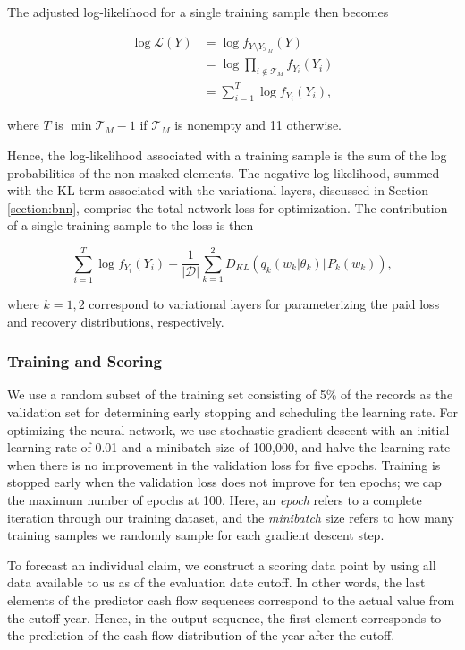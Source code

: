 \documentclass{article}
\begin{document}
The adjusted log-likelihood for a single training sample then becomes

\begin{align}
    \log\mathcal{L}(Y) &= \log  f_{Y\setminus Y_{\mathcal{T}_M}}(Y)\\
                       &= \log \prod_{i \notin \mathcal{T}_M} f_{Y_i}(Y_i)\\
                       &= \sum_{i = 1}^{T}\log f_{Y_i}(Y_i),
\end{align}

where $T$ is $\min \mathcal{T}_M - 1$ if $\mathcal{T}_M$ is nonempty and 11 otherwise.

Hence, the log-likelihood associated with a training sample is the sum of the log probabilities of the non-masked elements. The negative log-likelihood, summed with the KL term associated with the variational layers, discussed in Section  \ref{section:bnn}, comprise the total network loss for optimization. The contribution of a single training sample to the loss is then

\begin{equation}
    \sum_{i = 1}^{T}\log f_{Y_i}(Y_i) + \frac{1}{|\mathcal{D}|}\sum_{k=1}^2D_{KL}(q_k(w_k|\theta_k) \Vert P_k(w_k)),
\end{equation}

where $k=1, 2$ correspond to variational layers for parameterizing the paid loss and recovery distributions, respectively.

\subsubsection{Training and Scoring}

We use a random subset of the training set consisting of 5\% of the records as the validation set for determining early stopping and scheduling the learning rate. For optimizing the neural network, we use stochastic gradient descent with an initial learning rate of 0.01 and a minibatch size of 100,000, and halve the learning rate when there is no improvement in the validation loss for five epochs. Training is stopped early when the validation loss does not improve for ten epochs; we cap the maximum number of epochs at 100. Here, an \textit{epoch} refers to a complete iteration through our training dataset, and the \textit{minibatch} size refers to how many training samples we randomly sample for each gradient descent step.

To forecast an individual claim, we construct a scoring data point by using all data available to us as of the evaluation date cutoff. In other words, the last elements of the predictor cash flow sequences correspond to the actual value from the cutoff year. Hence, in the output sequence, the first element corresponds to the prediction of the cash flow distribution of the year after the cutoff.
\end{document}
